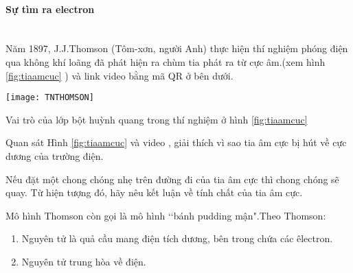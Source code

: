 \paragraph{Sự tìm ra electron}
\\
Năm 1897, J.J.Thomson (Tôm-xơn, người Anh) thực hiện thí nghiệm phóng điện qua không khí loãng đã phát hiện ra chùm tia phát ra từ cực âm.(xem hình \ref{fig:tiaamcuc} ) và link video bằng mã QR ở bên dưới.\\ 
\begin{minipage}{0.6\textwidth}
\begin{center}
\texttt{[image: TNTHOMSON]}\\
\label{fig:tiaamcuc}
\end{center}
\end{minipage}
\hfill
\begin{minipage}{0.3\textwidth}
\end{minipage}
\begin{hoivadap}
	Vai trò của lớp bột huỳnh quang trong thí nghiệm ở hình \ref{fig:tiaamcuc}
\end{hoivadap}
%
\begin{hoivadap}
Quan sát Hình \ref{fig:tiaamcuc} và video , giải thích vì sao tia âm cực bị hút về cực dương của trường điện.
\end{hoivadap}
%
\begin{hoivadap}
	Nếu đặt một chong chóng nhẹ trên đường đi của tia âm cực thì chong chóng sẽ quay. Từ hiện tượng đó, hãy nêu kết luận về tính chất của tia âm cực.
\end{hoivadap}
\newpage
\vspace*{6pt}
\begin{emcobiet}
	 Mô hình Thomson còn gọi là mô hình \lq\lq bánh pudding mận".Theo Thomson:
	\begin{enumerate}
		\item Nguyên tử là quả cầu mang điện tích dương, bên trong chứa các êlectron.
	    \item Nguyên tử trung hòa về điện.
	\end{enumerate}
\end{emcobiet}
%
%

